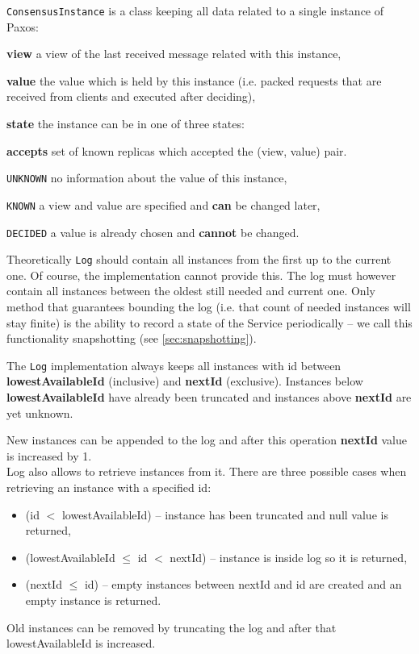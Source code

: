 \texttt{ConsensusInstance} is a class keeping all data related to a single instance of Paxos: %
\begin{tightList}[\setlength{\itemindent}{0pt}\setlength{\leftmargin}{2\leftmargin}]
  \item[\textbf{view}] a view of the last received message related with this instance,
  \item[\textbf{value}] the value which is held by this instance (i.e. packed requests that are received from clients and executed after deciding), %
  \item[\textbf{state}] the instance can be in one of three states:
  \item[\textbf{accepts}] set of known replicas which accepted the (view, value) pair.
  \begin{tightList}[\setlength{\itemindent}{0pt} \setlength{\labelwidth}{7em}]
    \item[\texttt{\tiny UNKNOWN}] no information about the value of this instance,
    \item[\texttt{\tiny KNOWN}] a view and value are specified and \textbf{can} be changed later,
    \item[\texttt{\tiny DECIDED}] a value is already chosen and \textbf{cannot} be changed.
  \end{tightList}
\end{tightList}

\begin{TODO}
Theoretically \texttt{Log} should contain all instances from the first up to the current one. Of course, the implementation cannot provide this. The log must however contain all instances between the oldest still needed and current one. Only method that guarantees bounding the log (i.e. that count of needed instances will stay finite) is the ability to record a state of the Service periodically -- we call this functionality snapshotting (see \ref{sec:snapshotting}). %
\end{TODO}

The \texttt{Log} implementation always keeps all instances with id between \textbf{lowestAvailableId} (inclusive) and \textbf{nextId} (exclusive). Instances below \textbf{lowestAvailableId} have already been truncated and instances above \textbf{nextId} are yet unknown. %

New instances can be appended to the log and after this operation \textbf{nextId} value is increased by 1. \\Log also allows to retrieve instances from it. There are three possible cases when retrieving an instance with a specified id:
\begin{itemize}
  \item (id $<$ lowestAvailableId) -- instance has been truncated and null value is returned,
  \item (lowestAvailableId $\leq$ id $<$ nextId) -- instance is inside log so it is returned,
  \item (nextId $\leq$ id) -- empty instances between nextId and id are created and an empty instance is returned.
\end{itemize}
Old instances can be removed by truncating the log and after that lowestAvailableId is increased. 


